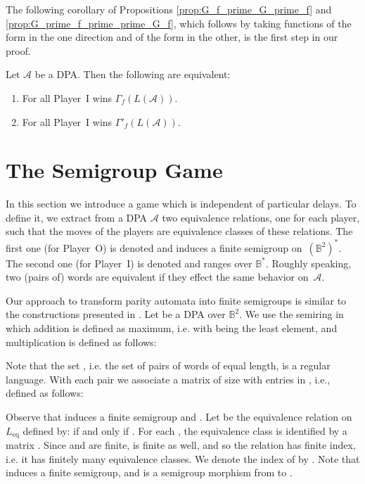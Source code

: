\documentclass[fleqn,envcountsame]{LMCS}
\newcommand{\aut}[1]{\ensuremath{\mathcal{#1}}}
\newcommand{\pI}{Player~I\xspace}
\newcommand{\pO}{Player~O\xspace}
\newcommand{\Leq}{\ensuremath{L_{\mathrm{eq}}}\xspace}
\newcommand{\GdLA}[1]{\ensuremath{\Gamma_{#1}(\LA)}\xspace}
\newcommand{\GpLA}[1]{\ensuremath{\Gamma'_{#1}(\LA)}\xspace}
\newcommand{\LA}{\ensuremath{L(\aut{A})}\xspace}
\newcommand{\Bst}{\ensuremath{\mathbb{B}^*}\xspace}
\newcommand{\Bsq}{\ensuremath{\mathbb{B}^2}\xspace}
\newcommand{\Bsqst}{\ensuremath{(\mathbb{B}^2)^*}\xspace}
\newcommand{\ie}{i.e.\xspace}
\begin{document}
The following corollary of Propositions \ref{prop:G_f_prime_G_prime_f} and
\ref{prop:G_prime_f_prime_prime_G_f}, which follows by taking functions of
the form  in the one direction and of the form  in the other,
is the first step in our proof.

\begin{cor}\label{cor:equivalence_all_Gf_all_G_prime_f}
Let \aut{A} be a DPA. Then the following are equivalent:
\begin{enumerate}[\em(1)]
\item For all  \pI wins \GdLA{f}.
\item For all  \pI wins \GpLA{f}.
\end{enumerate}
\end{cor}



\section{The Semigroup Game}\label{sec:semigroup_game}

In this section we introduce a game which is independent of particular delays.
To define it, we extract from a DPA \aut{A} two equivalence relations,
one for each player, such that the moves of the players are equivalence classes of
these relations. The first one (for \pO) is denoted  and induces
a finite semigroup on~\Bsqst. The second one (for \pI)
is denoted  and ranges over \Bst.
Roughly speaking, two (pairs of) words are equivalent
if they effect the same behavior on~\aut{A}.

Our approach to transform parity automata into finite semigroups
is similar to the constructions presented in \cite{PP95SemInfinite,Pin95FiniteSem}.
Let  be a DPA over \Bsq.
We use the semiring  in
which addition is defined as maximum, \ie  with 
being the least element, and multiplication is defined as follows:

Note that the set , \ie the set of pairs of words of equal length, is a regular language.
With each pair  we associate a matrix 
of size  with entries in , \ie ,
defined as follows:

Observe that  induces a finite semigroup and
.
Let  be the equivalence relation on \Leq defined by:
 if and only if .
For each , the equivalence class  is identified by
a matrix . Since  and 
are finite,  is finite as well, and so the
relation  has finite index, \ie it has finitely many equivalence classes.
We denote the index of  by . Note that 
induces a finite semigroup, and  is a semigroup morphism from
 to .
\end{document}
